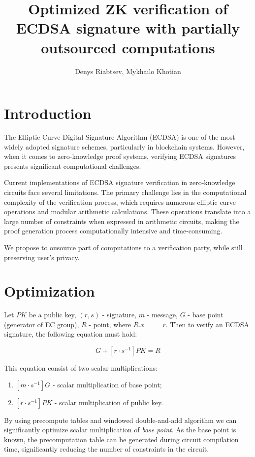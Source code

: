 \documentclass{iacrtrans}
\author{Denys Riabtsev, Mykhailo Khotian}
\institute{Distributed Lab}
\title{Optimized ZK verification of ECDSA signature with partially outsourced computations}
\begin{document}
\maketitle


\section{Introduction}
The Elliptic Curve Digital Signature Algorithm (ECDSA) is one of the most widely adopted signature schemes, particularly in blockchain systems. 
However, when it comes to zero-knowledge proof systems, verifying ECDSA signatures presents significant computational challenges.

Current implementations of ECDSA signature verification in zero-knowledge circuits face several limitations. 
The primary challenge lies in the computational complexity of the verification process, which requires numerous elliptic curve operations and modular arithmetic calculations. 
These operations translate into a large number of constraints when expressed in arithmetic circuits, making the proof generation process computationally intensive and time-consuming.

We propose to ousource part of computations to a verification party, while still preserving user's privacy.


\section{Optimization}
Let $PK$ be a public key, $(r, s)$ - signature, $m$ - message, $G$ - base point (generator of EC group), $R$ - point, where $R.x == r$.
Then to verify an ECDSA signature, the following equation must hold:

\begin{equation}
    [m \cdot s^{-1}] G + [r \cdot s^{-1}] PK = R
\end{equation}

This equation consist of two scalar multiplications:
\begin{enumerate}
    \item $[m \cdot s^{-1}] G$ - scalar multiplication of base point;
    \item $[r \cdot s^{-1}] PK$ - scalar multiplication of public key.
\end{enumerate}

By using precompute tables and windowed double-and-add algorithm we can significantly optimize scalar multiplication of \textit{base point}.
As the base point is known, the precomputation table can be generated during circuit compilation time, significantly reducing the number 
of constraints in the circuit.
\end{document}
